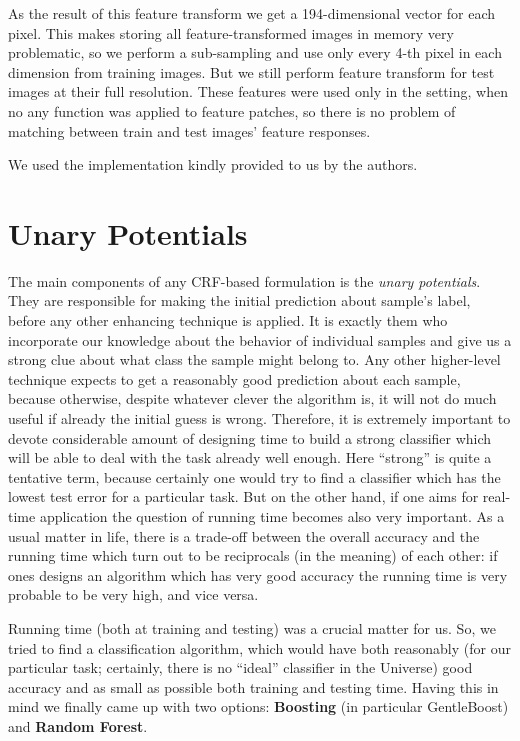 As the result of this feature transform we get a 194-dimensional vector for each pixel. This makes storing all
feature-transformed images in memory very problematic, so we perform a sub-sampling and use only every 4-th
pixel in each dimension from training images. But we still perform feature transform for test images at their
full resolution. These features were used only in the setting, when no any function was applied to feature patches, so
there is no problem of matching between train and test images' feature responses.

We used the implementation kindly provided to us by the authors.

\section{Unary Potentials}
\label{sec:unaries}
The main components of any CRF-based formulation is the \emph{unary potentials}. They are responsible for making the initial
prediction about sample's label, before any other enhancing technique is applied. It is exactly them who incorporate
our knowledge about the behavior of individual samples and give us a strong clue about what class the sample
might belong to. Any other higher-level technique expects to get a reasonably good prediction about each sample,
because otherwise, despite whatever clever the algorithm is, it will not do much useful if already the initial guess is wrong.
Therefore, it is extremely important to devote considerable amount of designing time to build a strong classifier which
will be able to deal with the task already well enough. Here ``strong'' is quite a tentative term, because certainly
one would try to find a classifier which has the lowest test error for a particular task. But on the other hand, if one aims
for real-time application the question of running time becomes also very important. As a usual matter in life, there is a
trade-off between the overall accuracy and the running time which turn out to be reciprocals (in the meaning) of each other: 
if ones designs an algorithm which has very good accuracy the running time is very probable to be very high, and vice versa.

Running time (both at training and testing) was a crucial matter for us. So, we tried to find a classification algorithm,
which would have both reasonably (for our particular task; certainly, there is no ``ideal'' classifier in the Universe) good
accuracy and as small as possible both training and testing time. Having this in mind we finally came up with two options:
{\bf Boosting} (in particular GentleBoost) and {\bf Random Forest}.

